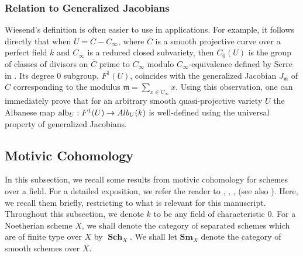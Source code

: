 \documentclass[12pt]{amsart}
\theoremstyle{remark}
\renewcommand{\1}{{\mathbb{S}}}
\newcommand{\alb}{{\rm alb}}
\newcommand{\Sch}{{\operatorname{\mathbf{Sch}}}}
\newcommand{\<}{\langle}
\renewcommand{\>}{\rangle}
\newcommand{\Sm}{{\mathbf{Sm}}}
\begin{document}
\subsubsection{Relation to Generalized Jacobians}\label{sec:genJac}
    Wiesend's definition is often easier to use in applications. For example, it follows directly that when $U=\overline{C}-C_\infty$, where $\overline{C}$ is a smooth projective curve over a perfect field $k$ and $C_\infty$ is a reduced closed subvariety, then $C_0(U)$ is the group of classes of divisors on $\overline{C}$ prime to $C_\infty$ modulo $C_\infty$-equivalence defined by Serre in \cite[Chapter V.2]{Se2}. Its degree $0$ subgroup, $F^1(U)$, coincides with the generalized Jacobian $J_\mathfrak{m}$ of $\overline{C}$ corresponding to the modulus $\displaystyle \mathfrak{m}=\sum_{x\in C_\infty}x$. 
    Using this observation, one can immediately prove that for an arbitrary smooth quasi-projective variety $U$ the Albanese map $\alb_U: F^1(U)\to Alb_U(k)$ is well-defined using the universal property of generalized Jacobians. 










	
	
	\subsection{Motivic Cohomology}\label{sec:motiviccoh}


    In this subsection, we recall some results from motivic cohomology for schemes over a field. For a detailed exposition, we refer the reader to \cite{Voe}, \cite{MVW}, \cite{CD2}, \cite{CD1} (see also \cite[Section~5]{GKR}). Here, we recall them briefly, restricting to what is relevant for this manuscript. Throughout this subsection, we denote $k$ to  be any field of characteristic  $0$.  For a Noetherian scheme $X$, we shall denote the category of separated schemes which are of finite type over $X$ by $\Sch_{X}$. We shall let $\Sm_{X}$ denote the category of smooth schemes over $X$. 
\end{document}
